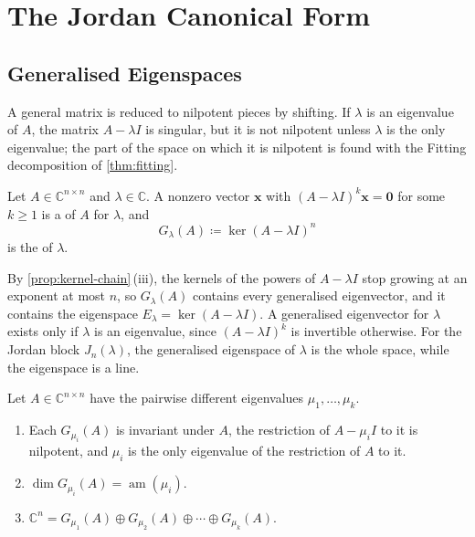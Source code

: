 \section{The Jordan Canonical Form}
\label{sec:jordan-form}

\subsection{Generalised Eigenspaces}

A general matrix is reduced to nilpotent pieces by shifting. If $\lambda$ is an eigenvalue of $A$, the matrix $A-\lambda I$ is singular, but it is not nilpotent unless $\lambda$ is the only eigenvalue; the part of the space on which it is nilpotent is found with the Fitting decomposition of \cref{thm:fitting}.

\begin{definition}
\label{def:generalised-eigenspace}
Let $A\in\mathbb C^{n\times n}$ and $\lambda\in\mathbb C$. A nonzero vector $\mathbf x$ with $(A-\lambda I)^k\mathbf x=\mathbf 0$ for some $k\ge1$ is a  of $A$ for $\lambda$, and
\[
G_\lambda(A)\coloneqq\ker(A-\lambda I)^n
\]
is the  of $\lambda$.
\end{definition}

By \cref{prop:kernel-chain}\,(iii), the kernels of the powers of $A-\lambda I$ stop growing at an exponent at most $n$, so $G_\lambda(A)$ contains every generalised eigenvector, and it contains the eigenspace $E_\lambda=\ker(A-\lambda I)$. A generalised eigenvector for $\lambda$ exists only if $\lambda$ is an eigenvalue, since $(A-\lambda I)^k$ is invertible otherwise. For the Jordan block $J_n(\lambda)$, the generalised eigenspace of $\lambda$ is the whole space, while the eigenspace is a line.

\begin{theorem}
\label{thm:generalised-eigenspaces}
Let $A\in\mathbb C^{n\times n}$ have the pairwise different eigenvalues $\mu_1,\ldots,\mu_k$.
\begin{enumerate}
\item Each $G_{\mu_i}(A)$ is invariant under $A$, the restriction of $A-\mu_iI$ to it is nilpotent, and $\mu_i$ is the only eigenvalue of the restriction of $A$ to it.
\item $\dim G_{\mu_i}(A)=\operatorname{am}(\mu_i)$.
\item $\mathbb C^n=G_{\mu_1}(A)\oplus G_{\mu_2}(A)\oplus\cdots\oplus G_{\mu_k}(A)$.
\end{enumerate}
\end{theorem}

